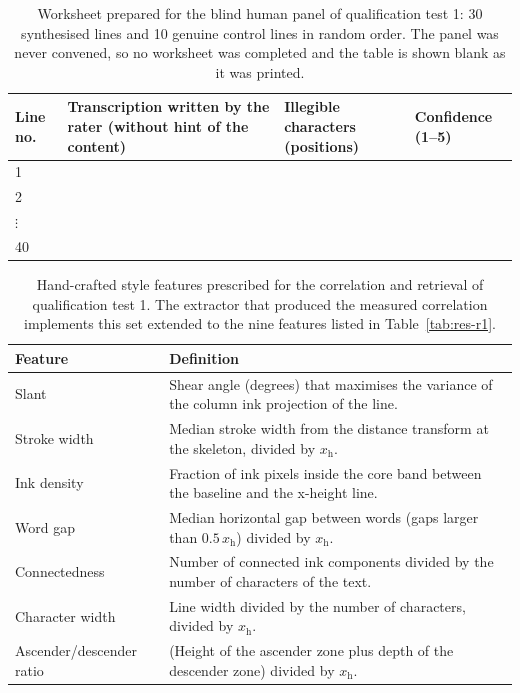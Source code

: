 \begin{table}[h]
\centering
\fontsize{10}{12}\selectfont
\begin{tabularx}{\linewidth}{|l|X|l|l|}
\hline
\textbf{Line no.} & \textbf{Transcription written by the rater (without hint of the content)} & \textbf{Illegible characters (positions)} & \textbf{Confidence (1--5)} \\
\hline
1 & & & \\
\hline
2 & & & \\
\hline
$\vdots$ & & & \\
\hline
40 & & & \\
\hline
\end{tabularx}
\caption{Worksheet prepared for the blind human panel of qualification test 1: 30 synthesised lines and 10 genuine control lines in random order. The panel was never convened, so no worksheet was completed and the table is shown blank as it was printed.}
\label{tab:res-panel}
\end{table}

\begin{table}[h]
\centering
\fontsize{10}{12}\selectfont
\begin{tabularx}{\linewidth}{|>{\raggedright\arraybackslash}p{3.3cm}|X|}
\hline
\textbf{Feature} & \textbf{Definition} \\
\hline
Slant & Shear angle (degrees) that maximises the variance of the column ink projection of the line. \\
\hline
Stroke width & Median stroke width from the distance transform at the skeleton, divided by $x_{\mathrm{h}}$. \\
\hline
Ink density & Fraction of ink pixels inside the core band between the baseline and the x-height line. \\
\hline
Word gap & Median horizontal gap between words (gaps larger than $0.5\,x_{\mathrm{h}}$) divided by $x_{\mathrm{h}}$. \\
\hline
Connectedness & Number of connected ink components divided by the number of characters of the text. \\
\hline
Character width & Line width divided by the number of characters, divided by $x_{\mathrm{h}}$. \\
\hline
Ascender/descender ratio & (Height of the ascender zone plus depth of the descender zone) divided by $x_{\mathrm{h}}$. \\
\hline
\end{tabularx}
\caption{Hand-crafted style features prescribed for the correlation and retrieval of qualification test 1. The extractor that produced the measured correlation implements this set extended to the nine features listed in Table~\ref{tab:res-r1}.}
\label{tab:res-features}
\end{table}

